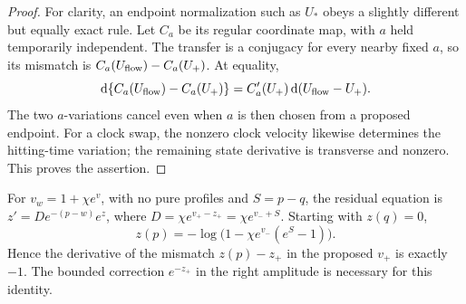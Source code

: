 \begin{proof}
For clarity, an endpoint normalization such as \(U_*\) obeys a slightly
different but equally exact rule.  Let \(C_a\) be its regular coordinate
map, with \(a\) held temporarily independent.  The transfer is a
conjugacy for every nearby fixed \(a\), so its mismatch is
\(C_a(U_{\rm flow})-C_a(U_+)\).  At equality,
\[
 \mathrm{d}\{C_a(U_{\rm flow})-C_a(U_+)\}
 =C_a'(U_+)\,\mathrm{d}(U_{\rm flow}-U_+).
\]
The two \(a\)-variations cancel even when \(a\) is then chosen from a
proposed endpoint.  For a clock swap, the nonzero clock velocity likewise
determines the hitting-time variation; the remaining state derivative is
transverse and nonzero.  This proves the assertion.
\end{proof}

\begin{example}
For \(v_w=1+\chi e^v\), with no pure profiles and \(S=p-q\), the
residual equation is \(z'=D e^{-(p-w)}e^z\), where
\(D=\chi e^{v_+-z_+}=\chi e^{v_-+S}\).  Starting with \(z(q)=0\),
\[
 z(p)=-\log\bigl(1-\chi e^{v_-}(e^S-1)\bigr).
\]
Hence the derivative of the mismatch \(z(p)-z_+\) in the proposed
\(v_+\) is exactly \(-1\).  The bounded correction
\(e^{-z_+}\) in the right amplitude is necessary for this identity.
\end{example}

